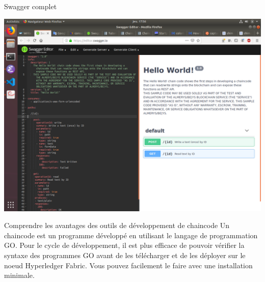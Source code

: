 \documentclass[presentation]{beamer}
\begin{document}
\begin{frame}[label={sec:orgc388d89}]{Swagger complet}
\begin{center}
\includegraphics[width=.9\linewidth]{./swagger_complete.png}
\end{center}
\end{frame}
\begin{frame}[label={sec:org76c9c46}]{Comprendre les avantages des outils de développement de chaincode}
Un chaincode est un programme développé en utilisant le langage de 
programmation GO. Pour le cycle de développement, il est plus efficace
de pouvoir vérifier la syntaxe des programmes GO avant de les télécharger
et de les déployer sur le noeud Hyperledger Fabric. Vous pouvez facilement
le faire avec une installation minimale.
\end{frame}
\end{document}

